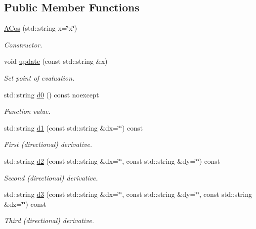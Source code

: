 \subsection*{Public Member Functions}
\begin{DoxyCompactItemize}
\item 
\hyperlink{structFunG_1_1stringify_1_1ACos_ac88103a266ad60f4897f997054257efb}{A\-Cos} (std\-::string x=\char`\"{}x\char`\"{})
\begin{DoxyCompactList}\small\item\em Constructor. \end{DoxyCompactList}\item 
void \hyperlink{structFunG_1_1stringify_1_1ACos_acef19810a07f43d17721f04d2976bdd1}{update} (const std\-::string \&x)
\begin{DoxyCompactList}\small\item\em Set point of evaluation. \end{DoxyCompactList}\item 
std\-::string \hyperlink{structFunG_1_1stringify_1_1ACos_a01ca7b10f8cf8e3223bbdccc0cae1adc}{d0} () const noexcept
\begin{DoxyCompactList}\small\item\em Function value. \end{DoxyCompactList}\item 
std\-::string \hyperlink{structFunG_1_1stringify_1_1ACos_a892c5c2c69878c2c9ef23577d5c75ca3}{d1} (const std\-::string \&dx=\char`\"{}\char`\"{}) const 
\begin{DoxyCompactList}\small\item\em First (directional) derivative. \end{DoxyCompactList}\item 
std\-::string \hyperlink{structFunG_1_1stringify_1_1ACos_ab6c7fa17da02c623cff2b3e9f97d9bba}{d2} (const std\-::string \&dx=\char`\"{}\char`\"{}, const std\-::string \&dy=\char`\"{}\char`\"{}) const 
\begin{DoxyCompactList}\small\item\em Second (directional) derivative. \end{DoxyCompactList}\item 
std\-::string \hyperlink{structFunG_1_1stringify_1_1ACos_acb6586416672760c57a3c9344c873088}{d3} (const std\-::string \&dx=\char`\"{}\char`\"{}, const std\-::string \&dy=\char`\"{}\char`\"{}, const std\-::string \&dz=\char`\"{}\char`\"{}) const 
\begin{DoxyCompactList}\small\item\em Third (directional) derivative. \end{DoxyCompactList}\end{DoxyCompactItemize}


